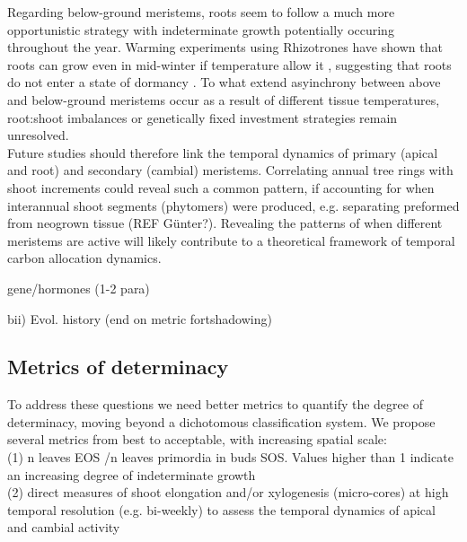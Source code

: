 \documentclass{article}
\begin{document}
Regarding below-ground meristems, roots seem to follow a much more opportunistic strategy with indeterminate growth potentially occuring throughout the year. Warming experiments using Rhizotrones have shown that roots can grow even in mid-winter if temperature allow it \cite{lyfordControlledGrowthForest1966}, suggesting that roots do not enter a state of dormancy \cite{radvilleRootPhenologyChanging2016}. To what extend asyinchrony between above and below-ground meristems occur as a result of different tissue temperatures, root:shoot imbalances or genetically fixed investment strategies remain unresolved\cite{abramoffAreBelowgroundPhenology2015, makotoSynchronousAsynchronousRoot2020}.\\

 Future studies should therefore link the temporal dynamics of primary (apical and root) and secondary (cambial) meristems. Correlating annual tree rings with shoot increments could reveal such a common pattern, if accounting for when interannual shoot segments (phytomers) were produced, e.g. separating preformed from neogrown tissue (REF Günter?). Revealing the patterns of when different meristems are active will likely contribute to a theoretical framework of temporal carbon allocation dynamics.

	

	gene/hormones (1-2 para) %
	
	bii) Evol. history (end on metric fortshadowing) %
	
	
	\subsection*{Metrics of determinacy}
	To address these questions we need better metrics to quantify the degree of determinacy, moving beyond a dichotomous classification system. We propose several metrics from best to acceptable, with increasing spatial scale: \\
	
	(1) n leaves  EOS /n leaves primordia in buds SOS. Values higher than 1 indicate an increasing degree of indeterminate growth \\
	
	(2) direct measures of shoot elongation and/or xylogenesis (micro-cores) at high temporal resolution (e.g. bi-weekly) to assess the temporal dynamics of apical and cambial activity\\
	
\end{document}
